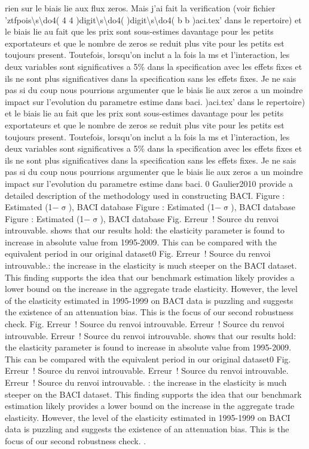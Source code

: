 \documentclass[12pt,twoside,a4paper,notitlepage]{article}
\begin{document}
rien sur le biais lie aux flux zeros. Mais j'ai fait la verification (voir fichier 'ztfpois\textbackslash s\textbackslash do4( 4 4 )digit\textbackslash s\textbackslash do4( )digit\textbackslash s\textbackslash do4( b b )aci.tex' dans le repertoire) et le biais lie au fait que les prix sont sous-estimes davantage pour les petits exportateurs et que le nombre de zeros se reduit plus vite pour les petits est toujours present. Toutefois, lorsqu'on inclut a la fois la ms et l'interaction, les deux variables sont significatives a 5\% dans la specification avec les effets fixes et ils ne sont plus significatives dans la specification sans les effets fixes. Je ne sais pas si du coup nous pourrions argumenter que le biais lie aux zeros a un moindre impact sur l'evolution du parametre estime dans baci. )aci.tex' dans le repertoire) et le biais lie au fait que les prix sont sous-estimes davantage pour les petits exportateurs et que le nombre de zeros se reduit plus vite pour les petits est toujours present. Toutefois, lorsqu'on inclut a la fois la ms et l'interaction, les deux variables sont significatives a 5\% dans la specification avec les effets fixes et ils ne sont plus significatives dans la specification sans les effets fixes. Je ne sais pas si du coup nous pourrions argumenter que le biais lie aux zeros a un moindre impact sur l'evolution du parametre estime dans baci. 0 Gaulier2010 provide a detailed description of the methodology used in constructing BACI. Figure : Estimated (1${-}$${\upsigma}$), BACI database Figure : Estimated (1${-}$${\upsigma}$), BACI database Figure : Estimated (1${-}$${\upsigma}$), BACI database Fig. Erreur~! Source du renvoi introuvable. shows that our results hold: the elasticity parameter is found to increase in absolute value from 1995-2009. This can be compared with the equivalent period in our original dataset0 Fig. Erreur~! Source du renvoi introuvable.: the increase in the elasticity is much steeper on the BACI dataset. This finding supports the idea that our benchmark estimation likely provides a lower bound on the increase in the aggregate trade elasticity. However, the level of the elasticity estimated in 1995-1999 on BACI data is puzzling and suggests the existence of an attenuation bias. This is the focus of our second robustness check. Fig. Erreur~! Source du renvoi introuvable. Erreur~! Source du renvoi introuvable. Erreur~! Source du renvoi introuvable. shows that our results hold: the elasticity parameter is found to increase in absolute value from 1995-2009. This can be compared with the equivalent period in our original dataset0 Fig. Erreur~! Source du renvoi introuvable. Erreur~! Source du renvoi introuvable. Erreur~! Source du renvoi introuvable. : the increase in the elasticity is much steeper on the BACI dataset. This finding supports the idea that our benchmark estimation likely provides a lower bound on the increase in the aggregate trade elasticity. However, the level of the elasticity estimated in 1995-1999 on BACI data is puzzling and suggests the existence of an attenuation bias. This is the focus of our second robustness check. 
 . 
\end{document}
